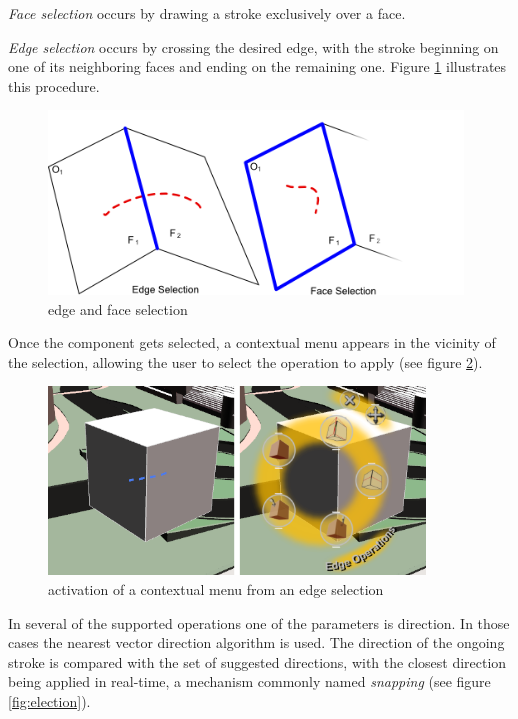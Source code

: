 \emph{Face selection} occurs by drawing a stroke exclusively over a face.

\emph{Edge selection} occurs by crossing the desired edge, with the stroke beginning
on one of its neighboring faces and ending on the remaining one.
Figure \ref{fig:selection} illustrates this procedure.

\begin{figure}[!ht]
	\centering
	\includegraphics[width=11cm]{gfx/face-edge-selection.png}
	\caption{edge and face selection}
	\label{fig:selection}
\end{figure}

Once the component gets selected, a contextual menu appears in the vicinity
of the selection, allowing the user to select the operation to apply (see figure \ref{fig:contextual}).

\begin{figure}[!ht]
	\centering
	\includegraphics[width=10cm]{gfx/contextual.png}
	\caption{activation of a contextual menu from an edge selection}
	\label{fig:contextual}
\end{figure}

In several of the supported operations one of the parameters is direction.
In those cases the nearest vector direction algorithm is used.
The direction of the ongoing stroke is compared with the set of suggested directions,
with the closest direction being applied in real-time, a mechanism commonly
named \textit{snapping} (see figure \ref{fig:election}).

